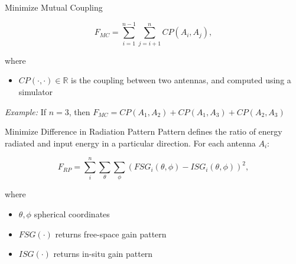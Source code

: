 \documentclass{beamer}
\begin{document}
\begin{frame}{Minimize Mutual Coupling}
    \begin{tcolorbox}[colback=green!5]
        \begin{equation}
            F_{MC} = \sum_{i=1}^{n-1}\sum_{j=i+1}^{n} CP(A_i, A_j),
        \end{equation}
    \end{tcolorbox}
    where
    \begin{itemize}
        \item $CP(\cdot, \cdot) \in \mathbb R$ is the coupling between two antennas, and computed using a simulator
    \end{itemize}
    \vspace{2mm}
    \small\textit{Example:} If $n=3$, then $F_{MC} = CP(A_1, A_2) + CP(A_1, A_3) + CP(A_2, A_3)$
\end{frame}


\begin{frame}{Minimize Difference in Radiation Pattern}
    Pattern defines the ratio of energy radiated and input energy in a particular direction. For each antenna $A_i$:
    \begin{tcolorbox}[colback=green!5]
        \begin{equation} \label{eq:rp}
            F_{RP} = \sum_i^n\sum_{\theta}\sum_{\phi} 
            \left( FSG_i(\theta,\phi) - ISG_i(\theta,\phi) \right) ^2,
        \end{equation}
    \end{tcolorbox}
    where
    \begin{itemize}
            \small
        \item $\theta, \phi$ spherical coordinates
        \item $FSG(\cdot)$ returns free-space gain pattern  
        \item $ISG(\cdot)$ returns in-situ gain pattern
    \end{itemize}

    \hspace{.6\textwidth}
\end{frame}
\end{document}
